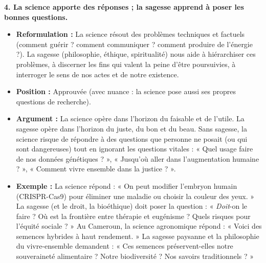 \documentclass[11pt]{article}
\newcommand{\cle}[1]{{\popxbold\color{popdark}#1}}
\begin{document}
\begin{corrige}
\textbf{4. La science apporte des réponses ; la sagesse apprend à poser les bonnes questions.}
\begin{itemize}
\item \textbf{Reformulation :} La science résout des \cle{problèmes techniques et factuels} (comment guérir ? comment communiquer ? comment produire de l'énergie ?). La sagesse (philosophie, éthique, spiritualité) nous aide à \cle{hiérarchiser} ces problèmes, à discerner les \cle{fins} qui valent la peine d'être poursuivies, à interroger le \cle{sens} de nos actes et de notre existence.
\item \textbf{Position :} Approuvée (avec nuance : la science pose aussi ses propres questions de recherche).
\item \textbf{Argument :} La science opère dans l'horizon du \cle{faisable} et de l'\cle{utile}. La sagesse opère dans l'horizon du \cle{juste}, du \cle{bon} et du \cle{beau}. Sans sagesse, la science risque de répondre à des questions que personne ne posait (ou qui sont dangereuses) tout en ignorant les questions vitales : « Quel usage faire de nos données génétiques ? », « Jusqu'où aller dans l'augmentation humaine ? », « Comment vivre ensemble dans la justice ? ».
\item \textbf{Exemple :} La science répond : « On peut modifier l'embryon humain (CRISPR-Cas9) pour éliminer une maladie ou choisir la couleur des yeux. » La sagesse (et le droit, la bioéthique) doit poser la question : « \emph{Doit}-on le faire ? Où est la frontière entre thérapie et eugénisme ? Quels risques pour l'équité sociale ? » Au Cameroun, la science agronomique répond : « Voici des semences hybrides à haut rendement. » La sagesse paysanne et la philosophie du \cle{vivre-ensemble} demandent : « Ces semences préservent-elles notre souveraineté alimentaire ? Notre biodiversité ? Nos savoirs traditionnels ? »
\end{itemize}
\end{corrige}
\end{document}
